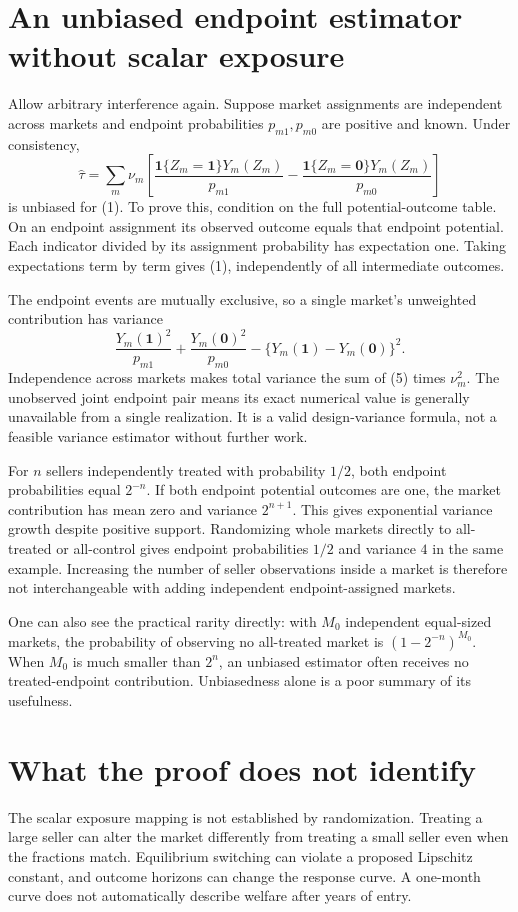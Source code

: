 \documentclass[11pt,a4paper]{article}
\newcommand{\ind}{\mathbf 1}
\begin{document}
\section{An unbiased endpoint estimator without scalar exposure}
Allow arbitrary interference again. Suppose market assignments are independent across markets and endpoint probabilities $p_{m1},p_{m0}$ are positive and known. Under consistency,
\[
 \widehat\tau=\sum_m\nu_m\left[
 \frac{\ind\{Z_m=\mathbf1\}Y_m(Z_m)}{p_{m1}}
 -\frac{\ind\{Z_m=\mathbf0\}Y_m(Z_m)}{p_{m0}}
 \right]
 \tag{4}
\]
is unbiased for (1). To prove this, condition on the full potential-outcome table. On an endpoint assignment its observed outcome equals that endpoint potential. Each indicator divided by its assignment probability has expectation one. Taking expectations term by term gives (1), independently of all intermediate outcomes.

The endpoint events are mutually exclusive, so a single market's unweighted contribution has variance
\[
 \frac{Y_m(\mathbf1)^2}{p_{m1}}+
 \frac{Y_m(\mathbf0)^2}{p_{m0}}
 -\{Y_m(\mathbf1)-Y_m(\mathbf0)\}^2.
 \tag{5}
\]
Independence across markets makes total variance the sum of (5) times $\nu_m^2$. The unobserved joint endpoint pair means its exact numerical value is generally unavailable from a single realization. It is a valid design-variance formula, not a feasible variance estimator without further work.

For $n$ sellers independently treated with probability $1/2$, both endpoint probabilities equal $2^{-n}$. If both endpoint potential outcomes are one, the market contribution has mean zero and variance $2^{n+1}$. This gives exponential variance growth despite positive support. Randomizing whole markets directly to all-treated or all-control gives endpoint probabilities $1/2$ and variance $4$ in the same example. Increasing the number of seller observations inside a market is therefore not interchangeable with adding independent endpoint-assigned markets.

One can also see the practical rarity directly: with $M_0$ independent equal-sized markets, the probability of observing no all-treated market is $(1-2^{-n})^{M_0}$. When $M_0$ is much smaller than $2^n$, an unbiased estimator often receives no treated-endpoint contribution. Unbiasedness alone is a poor summary of its usefulness.
\section{What the proof does not identify}
The scalar exposure mapping is not established by randomization. Treating a large seller can alter the market differently from treating a small seller even when the fractions match. Equilibrium switching can violate a proposed Lipschitz constant, and outcome horizons can change the response curve. A one-month curve does not automatically describe welfare after years of entry.
\end{document}
